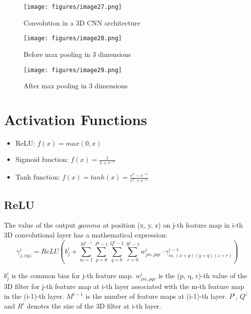 \documentclass[12pt]{book}
\begin{document}
\begin{figure}[!htbp]
\centering
  \texttt{[image: figures/image27.png]}
  \\
  \caption{Convolution in a 3D CNN architecture \cite{RAO2020}}
  \label{fig:fig19}
\end{figure}

\begin{figure}[!htbp]
\centering
  \texttt{[image: figures/image28.png]}
  \\
  \caption{Before max pooling in 3 dimensions \cite{RAO2020}}
  \label{fig:fig20}
\end{figure}

\begin{figure}[!htbp]
\centering
  \texttt{[image: figures/image29.png]}
  \\
  \caption{After max pooling in 3 dimensions \cite{RAO2020}}
  \label{fig:fig21}
\end{figure}

\section{Activation Functions}
\begin{itemize}
    \item ReLU: $f(x)=max(0,x)$
    \item Sigmoid function: $f(x)=\frac 1 {1+e^{-x}}$
    \item Tanh function: $f(x)=tanh(x)=\frac {e^x-e^{-x}} {e^x+e^{-x}}$
\end{itemize}

\subsection{ReLU}
The value of the output $gamma$ at position (x, y, z) on j-th feature map in i-th 3D convolutional layer has a mathematical expression:
 $${\gamma}_{j,xyz}^i=ReLU(b_j^i+\sum_{m=1}^{M^{i-1}}\sum_{p=0}^{P^i-1}\sum_{q=0}^{Q^i-1}\sum_{r=0}^{R^i-1} {w_{jm,pqr}^i \cdot {\gamma}_{m,(x+p)(y+q)(z+r)}^{i-1}})$$

$b_j^i$ is the common bias for j-th feature map. $w_{jm,pqr}^i$ is the (p, q, r)-th value of the 3D filter for j-th feature map at i-th layer associated with the m-th feature map in the (i-1)-th layer. $M^{i-1}$ is the number of feature maps at (i-1)-th layer. $P^i$, $Q^i$ and $R^i$ denotes the size of the 3D filter at i-th layer.  
\end{document}

